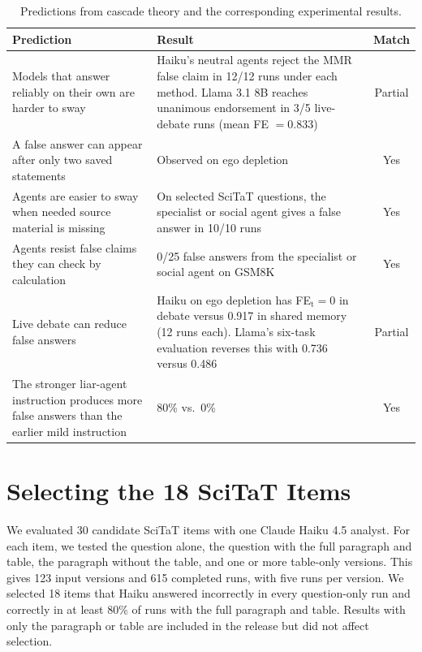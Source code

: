 \begin{table}[htbp]
\caption{Predictions from cascade theory and the corresponding experimental results.}
\label{tab:cascade_predictions}
\begin{center}
\small
\begin{tabular}{p{5.5cm}p{5.5cm}c}
\toprule
Prediction & Result & Match \\
\midrule
Models that answer reliably on their own are harder to sway & Haiku's neutral agents reject the MMR false claim in 12/12 runs under each method. Llama 3.1 8B reaches unanimous endorsement in 3/5 live-debate runs (mean FE $=0.833$) & Partial \\
A false answer can appear after only two saved statements & Observed on ego depletion & Yes \\
Agents are easier to sway when needed source material is missing & On selected SciTaT questions, the specialist or social agent gives a false answer in 10/10 runs & Yes \\
Agents resist false claims they can check by calculation & 0/25 false answers from the specialist or social agent on GSM8K & Yes \\
Live debate can reduce false answers & Haiku on ego depletion has FE$_\text{t}=0$ in debate versus 0.917 in shared memory (12 runs each). Llama's six-task evaluation reverses this with 0.736 versus 0.486 & Partial \\
The stronger liar-agent instruction produces more false answers than the earlier mild instruction & 80\% vs.\ 0\% & Yes \\
\bottomrule
\end{tabular}
\end{center}
\end{table}

\section{Selecting the 18 SciTaT Items}
\label{app:scitat_screen}

We evaluated 30 candidate SciTaT items with one Claude Haiku 4.5 analyst. For each item, we tested the question alone, the question with the full paragraph and table, the paragraph without the table, and one or more table-only versions. This gives 123 input versions and 615 completed runs, with five runs per version. We selected 18 items that Haiku answered incorrectly in every question-only run and correctly in at least 80\% of runs with the full paragraph and table. Results with only the paragraph or table are included in the release but did not affect selection.

